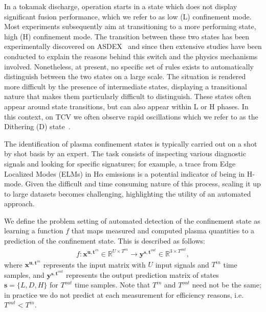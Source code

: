 In a tokamak discharge, operation starts in a state which does not display significant fusion performance, which we refer to as low (L) confinement mode. Most experiments subsequently aim at transitioning to a more performing state, high (H) confinement mode. The transition between these two states has been experimentally discovered on ASDEX~\cite{hmode1982} and since then extensive studies have been conducted to explain the reasons behind this switch and the physics mechanisms involved. Nonetheless, at present, no specific set of rules exists to automatically distinguish between the two states on a large scale. The situation is rendered more difficult by the presence of intermediate states, displaying a transitional nature that makes them particularly difficult to distinguish. These states often appear around state transitions, but can also appear within L or H phases. In this context, on TCV we often observe rapid oscillations which we refer to as the Dithering (D) state~\cite{martindither2004,tcvdither2024}. 

The identification of plasma confinement states is typically carried out on a shot by shot basis by an expert. The task consists of inspecting various diagnostic signals and looking for specific signatures; for example, a trace from Edge Localized Modes (ELMs) in H$\alpha$ emissions is a potential indicator of being in H-mode. Given the difficult and time consuming nature of this process, scaling it up to large datasets becomes challenging, highlighting the utility of an automated approach.

We define the problem setting of automated detection of the confinement state as learning a function $f$ that maps measured and computed plasma quantities to a prediction of the confinement state. This is described as follows:
\begin{align}
f: \mathbf{x}^{\mathbf{u},\mathbf{t}^{\textit{in}}} \in \mathbb{R}^{\textit{U} \times \textit{T}^{\textit{in}}} \rightarrow \mathbf{y}^{\mathbf{s},\mathbf{t}^{\textit{out}}} \in \mathbb{R}^{3 \times \textit{T}^{\textit{out}}}, 
\label{eq:formulation}
\end{align}
where $\mathbf{x}^{\mathbf{u},\mathbf{t}^{\textit{in}}}$ represents the input matrix with $\textit{U}$ input signals and $\textit{T}^{\textit{in}}$ time samples, and $\mathbf{y}^{\mathbf{s},\mathbf{t}^{\textit{out}}}$ represents the output prediction matrix of states $\mathbf{s} = \{L, D, H\}$ for $\textit{T}^{\textit{out}}$ time samples. Note that $\textit{T}^{\textit{in}}$ and $\textit{T}^{\textit{out}}$ need not be the same; in practice we do not predict at each measurement for efficiency reasons, i.e. $\textit{T}^{\textit{out}} < \textit{T}^{\textit{in}}$.

